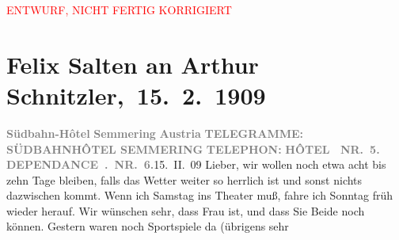 
\begin{center}
            \textcolor{red}{ENTWURF, NICHT FERTIG KORRIGIERT}
                      \end{center}
            
         
         \renewcommand{\erwaehntePersonen}{Personen: Felix Salten, Ottilie Salten, Olga Schnitzler}
         \renewcommand{\erwaehnteOrte}{Orte: Semmering, Südbahnhotel, Wien, Österreich}
         \renewcommand{\erwaehnteWerke}{}
               \section[ Felix Salten an Arthur Schnitzler, 15. 2. 1909]{ Felix Salten an Arthur Schnitzler, 15. 2. 1909}\nopagebreak{}\rehead{ }\begin{ledgroupsized}[t]{13cm}\normalsize\beginnumbering \toendnotes[C]{\smallbreak\pagebreak[2]} 
\toendnotes[C]{\smallbreak}\pstart
           \noindent{}{\pb}\textcolor{gray}{\textbf{Südbahn-Hôtel}}\pend
           \pstart
           \textcolor{gray}{\textbf{Semmering}}\pend
           \pstart
           \textcolor{gray}{\textbf{Austria}}\pend
           \pstart
           \textcolor{gray}{\textbf{\textsc{TELEGRAMME:}}}\pend
           \pstart
           \textcolor{gray}{\textbf{\textsc{SÜDBAHNHÔTEL SEMMERING}}}\pend
           \pstart
           \textcolor{gray}{\textbf{\textsc{TELEPHON:}}}\pend
           \pstart
           \textcolor{gray}{\textbf{\textsc{HÔTEL {\dotsfour} NR. 5.}}}\pend
           \pstart
           \textcolor{gray}{\textbf{\textsc{DEPENDANCE . NR. 6.}}}\hfill 15. II. 09\pend
           \pstart
           Lieber, wir wollen noch etwa acht bis zehn Tage bleiben, falls das
               Wetter weiter so herrlich ist und sonst nichts dazwischen kommt. Wenn ich Samstag ins Theater muß, fahre ich Sonntag früh wieder herauf. Wir wünschen sehr, dass Frau
                  \label{K_L03522-1v}\label{K_L03522-1h} ist, und dass Sie Beide noch \label{K_L03522-2v}\label{K_L03522-2h} können. Gestern waren noch Sportspiele da (übrigens sehr

\end{ledgroupsized}
